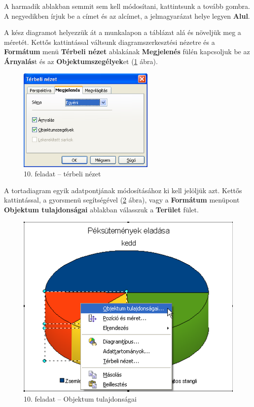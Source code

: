 A harmadik ablakban semmit sem kell módosítani, kattintsunk a
tovább gombra. A negyedikben írjuk be a címet és az alcímet,
a jelmagyarázat helye legyen \textbf{Alul}.

A kész diagramot helyezzük át a munkalapon a táblázat alá
és növeljük meg a méretét. Kettős kattintással
váltsunk diagramszerkesztési nézetre és a \textbf{Formátum}
menü \textbf{Térbeli nézet} ablakának \textbf{Megjelenés}
fülén kapcsoljuk be az \textbf{Árnyalás}t és az
\textbf{Objektumszegélyek}et (\ref{10-feladatTérbeli} ábra).

\begin{figure}[!h]
\begin{center}
\includegraphics[width=6.636cm]{oocalcv2-img61.png}
\caption{10.  feladat --  térbeli nézet}\label{10-feladatTérbeli}
\end{center}
\end{figure}

A tortadiagram egyik adatpontjának módosításához ki kell
jelöljük azt. Kettős kattintással, a gyorsmenü
segítségével (\ref{10-feladatObjektum} ábra), vagy a \textbf{Formátum} menüpont
\textbf{Objektum tulajdonságai} ablakban válasszuk a
\textbf{Terület} fület.

\begin{figure}[!h]
\begin{center}
\includegraphics[width=11.324cm]{oocalcv2-img62.png}
\caption{10. feladat --  Objektum tulajdonságai}\label{10-feladatObjektum}
\end{center}
\end{figure}

